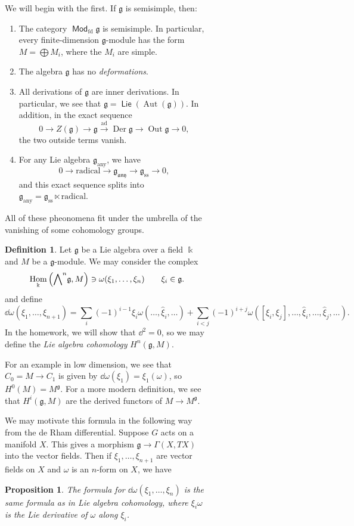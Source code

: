 \documentclass[leqno, openany]{memoir}
\newtheorem{prop}[thm]{Proposition}
\theoremstyle{definition}
\newtheorem{defn}[thm]{Definition}
\theoremstyle{remark}
\theoremstyle{plain}
\theoremstyle{definition}
\theoremstyle{remark}
\renewcommand{\k}{\Bbbk}
\newcommand{\mf}[1]{\mathfrak{#1}}
\newcommand{\mr}[1]{\mathrm{#1}}
\newcommand{\wh}[1]{\widehat{#1}}
\DeclareMathOperator{\Hom}{Hom}
\DeclareMathOperator{\ad}{ad}
\DeclareMathOperator{\Aut}{Aut}
\DeclareMathOperator{\Lie}{\mathsf{Lie}}
\DeclareMathOperator{\Mod}{\mathsf{Mod}}
\begin{document}
\begin{figure}[H]
\begin{figure}[H]
We will begin with the first. If $\mf{g}$ is semisimple, then:
\begin{enumerate} \item The category $\Mod_{\mr{fd}} \mf{g}$ is semisimple. In
    particular, every finite-dimension $\mf{g}$-module has the form $M =
    \bigoplus M_i$, where the $M_i$ are simple.  \item The algebra $\mf{g}$ has
    no \textit{deformations}.  \item All derivations of $\mf{g}$ are inner
    derivations. In particular, we see that $\mf{g} = \Lie(\Aut(\mf{g}))$. In
    addition, in the exact sequence \[ 0 \to Z(\mf{g}) \to \mf{g}
        \xrightarrow{\ad} \operatorname{Der} \mf{g} \to \operatorname{Out}
        \mf{g} \to 0, \] the two outside terms vanish.  \item For any Lie
        algebra $\mf{g}_{\mr{any}}$, we have \[ 0 \to \text{radical} \to
        \mf{g}_{\mf{any}} \to \mf{g}_{\mr{ss}} \to 0, \] and this exact
sequence splits into $\mf{g}_{\mr{any}} = \mf{g}_{\mr{ss}} \ltimes
\text{radical}$.  \end{enumerate} All of these pheonomena fit under the
umbrella of the vanishing of some cohomology groups.

\begin{defn} Let $\mf{g}$ be a Lie algebra over a field $\k$ and $M$ be a
    $\mf{g}$-module. We may consider the complex \[ \Hom_{\k}
        \qty({\bigwedge}^n \mf{g}, M) \ni \omega(\xi_1, \ldots, \xi_n) \qquad
        \xi_i \in \mf{g}. \] and define \[ \dd{\omega}(\xi_1, \ldots,
    \xi_{n+1}) = \sum_i {(-1)}^{i-1} \xi_i \omega (\ldots, \wh{\xi}_i, \ldots)
+ \sum_{i < j} {(-1)}^{i+j} \omega ([\xi_i, \xi_j], \ldots, \wh{\xi}_i, \ldots,
\wh{\xi}_j, \ldots). \] In the homework, we will show that $\dd^2 = 0$, so we
may define the \textit{Lie algebra cohomology} $H^n(\mf{g}, M)$.  \end{defn}

For an example in low dimension, we see that $C_0 = M \to C_1$ is given by
$\dd{\omega} (\xi_1) = \xi_1 (\omega)$, so $H^0(M) = M^{\mf{g}}$. For a more
modern definition, we see that $H^i(\mf{g}, M)$ are the derived functors of $M
\to M^{\mf{g}}$.

We may motivate this formula in the following way from the de Rham
differential. Suppose $G$ acts on a manifold $X$. This gives a morphism $\mf{g}
\to \Gamma(X, TX)$ into the vector fields. Then if $\xi_1, \ldots, \xi_{n+1}$
are vector fields on $X$ and $\omega$ is an $n$-form on $X$, we have
\begin{prop} The formula for $\dd{\omega} (\xi_1, \ldots, \xi_n)$ is the same
formula as in Lie algebra cohomology, where $\xi_i \omega$ is the Lie
derivative of $\omega$ along $\xi_i$.  \end{prop}


\end{figure}
\end{figure}
\end{document}
